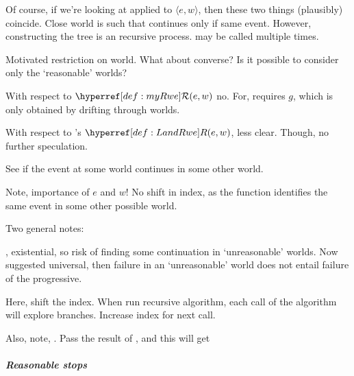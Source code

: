 \begin{note}
  Of course, if we're looking at \AlgFindBranches{} applied to \(\langle e,w \rangle\), then these two things (plausibly) coincide.
  Close world is such that continues only if same event.
  However, constructing the tree is an recursive process.
  \AlgFindBranches{} may be called multiple times.
\end{note}


\begin{note}
  Motivated restriction on world.
  What about converse?
  Is it possible to consider only the `reasonable' worlds?

  With respect to \(\mRwe{w}{e}\) no.
  For, requires \(g\), which is only obtained by drifting through worlds.

  With respect to \citeauthor{Landman:1992wh}'s \(\lRwe{w}{e}\), less clear.
  Though, no further speculation.
\end{note}

\begin{note}
  See if the event at some world continues in some other world.
  
  Note, importance of \(e\) and \(w\)!
  No shift in index, as the function identifies the same event in some other possible world.
\end{note}

\begin{note}
  Two general notes:

  \citeauthor{Landman:1992wh}, existential, so risk of finding some continuation in `unreasonable' worlds.
  Now suggested universal, then failure in an `unreasonable' world does not entail failure of the progressive.
\end{note}

\begin{note}
  Here, shift the index.
  When run recursive algorithm, each call of the algorithm will explore branches.
  Increase index for next call.

  Also, note, \AlgGetPStops{}.
  Pass the result of \AlgGetPStops{}, and this will get 
\end{note}

\subparagraph{Reasonable stops}
\label{cha:sec:fcs-def:progressive-landman:alg:R-stops}

